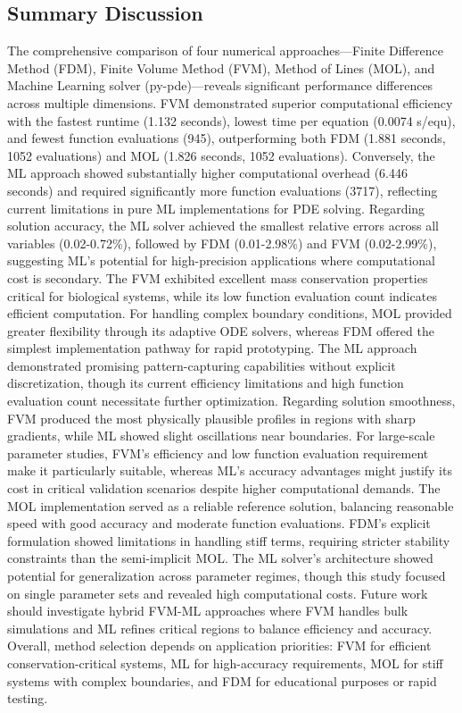 \documentclass[conference]{IEEEtran}
\begin{document}
\subsection{Summary Discussion}
The comprehensive comparison of four numerical approaches—Finite Difference Method (FDM), Finite Volume Method (FVM), Method of Lines (MOL), and Machine Learning solver (py-pde)—reveals significant performance differences across multiple dimensions. FVM demonstrated superior computational efficiency with the fastest runtime (1.132 seconds), lowest time per equation (0.0074 s/equ), and fewest function evaluations (945), outperforming both FDM (1.881 seconds, 1052 evaluations) and MOL (1.826 seconds, 1052 evaluations). Conversely, the ML approach showed substantially higher computational overhead (6.446 seconds) and required significantly more function evaluations (3717), reflecting current limitations in pure ML implementations for PDE solving. Regarding solution accuracy, the ML solver achieved the smallest relative errors across all variables (0.02-0.72\%), followed by FDM (0.01-2.98\%) and FVM (0.02-2.99\%), suggesting ML's potential for high-precision applications where computational cost is secondary. The FVM exhibited excellent mass conservation properties critical for biological systems, while its low function evaluation count indicates efficient computation. For handling complex boundary conditions, MOL provided greater flexibility through its adaptive ODE solvers, whereas FDM offered the simplest implementation pathway for rapid prototyping. The ML approach demonstrated promising pattern-capturing capabilities without explicit discretization, though its current efficiency limitations and high function evaluation count necessitate further optimization. Regarding solution smoothness, FVM produced the most physically plausible profiles in regions with sharp gradients, while ML showed slight oscillations near boundaries. For large-scale parameter studies, FVM's efficiency and low function evaluation requirement make it particularly suitable, whereas ML's accuracy advantages might justify its cost in critical validation scenarios despite higher computational demands. The MOL implementation served as a reliable reference solution, balancing reasonable speed with good accuracy and moderate function evaluations. FDM's explicit formulation showed limitations in handling stiff terms, requiring stricter stability constraints than the semi-implicit MOL. The ML solver's architecture showed potential for generalization across parameter regimes, though this study focused on single parameter sets and revealed high computational costs. Future work should investigate hybrid FVM-ML approaches where FVM handles bulk simulations and ML refines critical regions to balance efficiency and accuracy. Overall, method selection depends on application priorities: FVM for efficient conservation-critical systems, ML for high-accuracy requirements, MOL for stiff systems with complex boundaries, and FDM for educational purposes or rapid testing.
\end{document}
